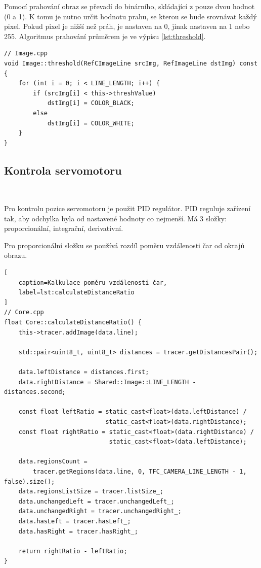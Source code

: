 Pomocí prahování obraz se převadí do binárního, skládající z pouze dvou hodnot (0 a 1).
K tomu je nutno určit hodnotu prahu, se kterou se bude srovnávat každý pixel.
Pokud pixel je nižší než práh, je nastaven na 0, jinak nastaven na 1 nebo 255.
Algoritmus prahování průměrem je ve výpisu \ref{lst:threshold}\cite{robot}.
\begin{lstlisting}[caption=Prahování průměrem, label=lst:threshold]
// Image.cpp
void Image::threshold(RefCImageLine srcImg, RefImageLine dstImg) const {
    for (int i = 0; i < LINE_LENGTH; i++) {
        if (srcImg[i] < this->threshValue)
            dstImg[i] = COLOR_BLACK;
        else
            dstImg[i] = COLOR_WHITE;
    }
}
\end{lstlisting}

\subsection{Kontrola servomotoru}\

Pro kontrolu pozice servomotoru je použit PID regulátor. PID reguluje
zařízení tak, aby odchylka byla od nastavené hodnoty co nejmenší. Má 3 složky: proporcionální, integrační, derivativní\cite{PID}.

Pro proporcionální složku se používá rozdíl poměru vzdálenosti čar od okrajů obrazu.
\begin{lstlisting}[
	caption=Kalkulace poměru vzdálenosti čar,
	label=lst:calculateDistanceRatio
]
// Core.cpp
float Core::calculateDistanceRatio() {
    this->tracer.addImage(data.line);

    std::pair<uint8_t, uint8_t> distances = tracer.getDistancesPair();

    data.leftDistance = distances.first;
    data.rightDistance = Shared::Image::LINE_LENGTH - distances.second;

    const float leftRatio = static_cast<float>(data.leftDistance) /
                            static_cast<float>(data.rightDistance);
    const float rightRatio = static_cast<float>(data.rightDistance) /
                             static_cast<float>(data.leftDistance);

    data.regionsCount =
        tracer.getRegions(data.line, 0, TFC_CAMERA_LINE_LENGTH - 1, false).size();
    data.regionsListSize = tracer.listSize_;
    data.unchangedLeft = tracer.unchangedLeft_;
    data.unchangedRight = tracer.unchangedRight_;
    data.hasLeft = tracer.hasLeft_;
    data.hasRight = tracer.hasRight_;

    return rightRatio - leftRatio;
}
\end{lstlisting}

